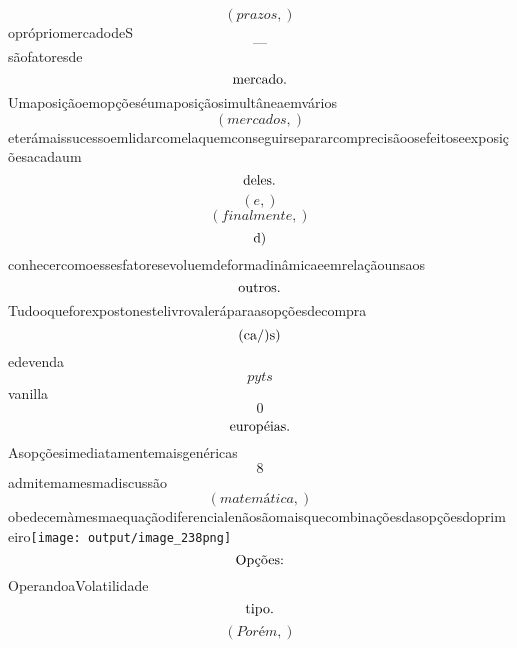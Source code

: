 \documentclass{article}
\begin{document}
\begin{equation}
\left( prazos,\right)
\end{equation}oprópriomercadodeS\begin{equation}
—
\end{equation}sãofatoresde\begin{equation}
$mercado.$
\end{equation}Umaposiçãoemopçõeséumaposiçãosimultâneaemvários\begin{equation}
\left( mercados,\right)
\end{equation}eterámaissucessoemlidarcomelaquemconseguirsepararcomprecisãoosefeitoseexposiçõesacadaum\begin{equation}
$deles.$
\end{equation}\begin{equation}
\left( e,\right)
\end{equation}\begin{equation}
\left( finalmente,\right)
\end{equation}\begin{equation}
$d)$
\end{equation}conhecercomoessesfatoresevoluemdeformadinâmicaeemrelaçãounsaos\begin{equation}
$outros.$
\end{equation}Tudooqueforexpostonestelivrovaleráparaasopçõesdecompra\begin{equation}
$(ca/)s)$
\end{equation}edevenda\begin{equation}
pyts
\end{equation}vanilla\begin{equation}
0
\end{equation}\begin{equation}
$européias.$
\end{equation}Asopçõesimediatamentemaisgenéricas\begin{equation}
8
\end{equation}admitemamesmadiscussão\begin{equation}
\left( matemática,\right)
\end{equation}obedecemàmesmaequaçãodiferencialenãosãomaisquecombinaçõesdasopçõesdoprimeiro\texttt{[image: output/image\_238png]}\begin{equation}
$Opções:$
\end{equation}OperandoaVolatilidade\begin{equation}
$tipo.$
\end{equation}\begin{equation}
\left( Porém,\right)

\end{equation}
\end{document}
